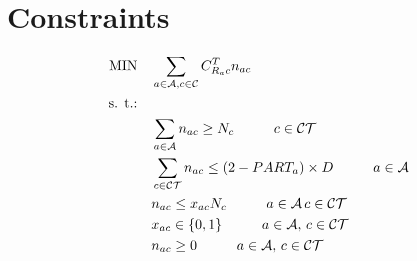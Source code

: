 \section{Constraints}


\begin{align}
\mbox{MIN} \quad &
                     \sum_{a \in \mathcal{A},c \in \mathcal{C}}C^{T}_{R_ac}n_{ac}    \label{eq:fo1}\\
\mbox{s. t.:} \quad &  \notag \\		
             & \sum_{a \in \mathcal{A}}n_{ac}\geq N_c 
               \hspace{10mm} c \in \mathcal{CT}\label{eq:allaudited}\\		
             & \sum_{c \in \mathcal{CT}}n_{ac}\leq (2-PART_a)\times D 
               \hspace{10mm} a \in \mathcal{A}\label{eq:upperbound}\\
             & n_{ac}\leq x_{ac}N_c
               \hspace{10mm} a \in \mathcal{A}\, c \in \mathcal{CT}\label{eq:consistency1}\\		  		  
             & x_{ac}  \in \{0,1\}
               \hspace{10mm} a \in \mathcal{A}, \, c \in \mathcal{CT}
               \label{eq:dom-x} \\
             & n_{ac}  \geq 0
               \hspace{10mm} a \in \mathcal{A}, \, c \in \mathcal{CT}
               \label{eq:dom-xS} \\
\end{align}	